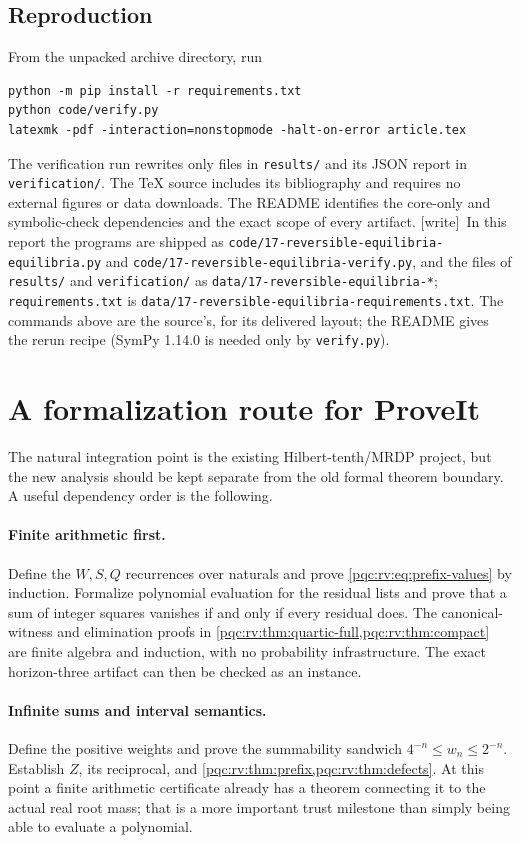 \documentclass[11pt,letterpaper]{article}
\numberwithin{equation}{section}
\theoremstyle{definition}
\theoremstyle{remark}
\newcommand{\code}[1]{\nolinkurl{#1}}
\newcommand{\wtag}{\textup{[write]}}
\newcommand{\srcmark}[1]{\par\noindent{\small\itshape [source~#1]}\par}
\begin{document}
\subsection{Reproduction}
From the unpacked archive directory, run
\begin{lstlisting}
python -m pip install -r requirements.txt
python code/verify.py
latexmk -pdf -interaction=nonstopmode -halt-on-error article.tex
\end{lstlisting}
The verification run rewrites only files in \code{results/} and its
JSON report in \code{verification/}. The TeX source includes its
bibliography and requires no external figures or data downloads.
The README identifies the core-only and symbolic-check dependencies
and the exact scope of every artifact.
\wtag\ In this report the programs are shipped as
\code{code/17-reversible-equilibria-equilibria.py} and
\code{code/17-reversible-equilibria-verify.py}, and the files of
\code{results/} and \code{verification/} as
\code{data/17-reversible-equilibria-*}; \code{requirements.txt} is
\code{data/17-reversible-equilibria-requirements.txt}. The commands above are
the source's, for its delivered layout; the README gives the rerun recipe
(SymPy 1.14.0 is needed only by \code{verify.py}).

\section{A formalization route for ProveIt}
\label{pqc:rv:sec:formalization}
\srcmark{17}
The natural integration point is the existing Hilbert-tenth/MRDP
project, but the new analysis should be kept separate from the old
formal theorem boundary. A useful dependency order is the following.

\paragraph{Finite arithmetic first.}
Define the $W,S,Q$ recurrences over naturals and prove
\cref{pqc:rv:eq:prefix-values} by induction. Formalize polynomial evaluation
for the residual lists and prove that a sum of integer squares
vanishes if and only if every residual does. The canonical-witness
and elimination proofs in \cref{pqc:rv:thm:quartic-full,pqc:rv:thm:compact} are
finite algebra and induction, with no probability infrastructure.
The exact horizon-three artifact can then be checked as an instance.

\paragraph{Infinite sums and interval semantics.}
Define the positive weights and prove the summability sandwich
$4^{-n}\leq w_n\leq2^{-n}$. Establish $Z$, its reciprocal, and
\cref{pqc:rv:thm:prefix,pqc:rv:thm:defects}. At this point a finite arithmetic
certificate already has a theorem connecting it to the actual real
root mass; that is a more important trust milestone than simply
being able to evaluate a polynomial.
\end{document}

